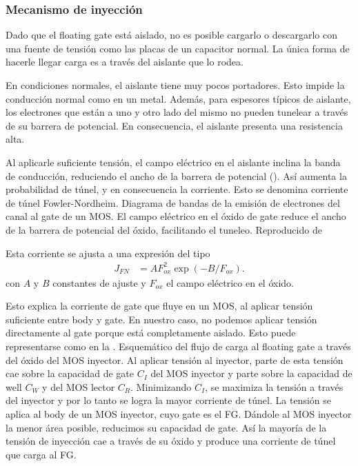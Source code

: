 \subsubsection{Mecanismo de inyección}
Dado que el floating gate está aislado,
no es posible cargarlo o descargarlo con una fuente de tensión
como las placas de un capacitor normal.
La única forma de hacerle llegar carga es 
a través del aislante que lo rodea.

En condiciones normales, el aislante tiene muy pocos portadores.
Esto impide la conducción normal como en un metal.
Además, para espesores típicos de aislante, 
los electrones que están a uno y otro lado del mismo
no pueden tunelear a través de su barrera de potencial.
En consecuencia, el aislante presenta una resistencia alta.

Al aplicarle suficiente tensión,
el campo eléctrico en el aislante inclina la banda de conducción,
reduciendo el ancho de la barrera de potencial
().
Así aumenta la probabilidad de túnel, y en consecuencia la corriente.
Esto se denomina corriente de túnel
Fowler-Nordheim\cite{lenzlinger_fowlernordheim_1969}.
{Diagrama de bandas de la emisión de electrones del canal al gate de un MOS. 
El campo eléctrico en el óxido de gate reduce el ancho de la barrera de
potencial del óxido, facilitando el tuneleo.
Reproducido de \cite{lenzlinger_fowlernordheim_1969}}

Esta corriente se ajusta a una expresión del tipo
\begin{align*}
    J_{FN} &= AF_{ox}^2\exp(-B/F_{ox}).
\end{align*}
con $A$ y $B$ constantes de ajuste 
y $F_{ox}$ el campo eléctrico en el óxido.

Esto explica la corriente de gate que fluye en un MOS,
al aplicar tensión suficiente entre body y gate.
En nuestro caso, no podemos aplicar tensión directamente al gate
porque está completamente aislado.
Esto puede representarse como en la .
{Esquemático del flujo de carga al floating gate 
a través del óxido del MOS inyector.
Al aplicar tensión al inyector,
parte de esta tensión cae sobre 
la capacidad de gate $C_I$ del MOS inyector 
y parte sobre la capacidad de well $C_W$ y del MOS lector $C_R$.
Minimizando $C_I$, se maximiza la tensión a través del inyector
y por lo tanto se logra la mayor corriente de túnel.}
La tensión se aplica al body de un MOS inyector,
cuyo gate es el FG.
Dándole al MOS inyector la menor área posible, 
reducimos su capacidad de gate.
Así la mayoría de la tensión de inyección cae a través de su óxido
y produce una corriente de túnel que carga al FG.

